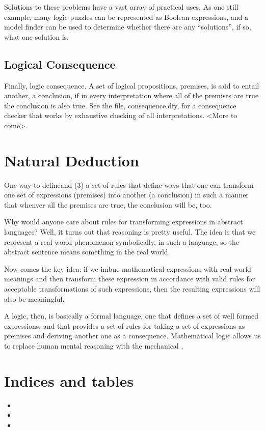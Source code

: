 \documentclass[letterpaper,10pt,english]{sphinxmanual}
\begin{document}
Solutions to these problems have a vast array of practical uses.  As
one still example, many logic puzzles can be represented as Boolean
expressions, and a model finder can be used to determine whether there
are any “solutions”, if so, what one solution is.


\section{Logical Consequence}
\label{\detokenize{08-propositional-logic:logical-consequence}}
Finally, logic consequence. A set of logical propositions, premises,
is said to entail another, a conclusion, if in every interpretation
where all of the premises are true the conclusion is also true. See
the file, consequence.dfy, for a consequence checker that works by
exhaustive checking of all interpretations. \textless{}More to come\textgreater{}.


\chapter{Natural Deduction}
\label{\detokenize{09-natural-deduction:natural-deduction}}\label{\detokenize{09-natural-deduction::doc}}
One way
to defineand (3) a set of  rules that define ways that one
can transform one set of expressions (premises) into another (a
conclusion) in such a manner that whenver all the premises are true,
the conclusion will be, too.

Why would anyone care about rules for transforming expressions in
abstract languages? Well, it turns out that  reasoning is
pretty useful. The idea is that we represent a real-world phenomenon
symbolically, in such a language, so the abstract sentence means
something in the real world.

Now comes the key idea: if we imbue mathematical expressions with
real-world meanings and then transform these expression in accordance
with valid rules for acceptable transformations of such expressions,
then the resulting expressions will also be meaningful.

A logic, then, is basically a formal language, one that defines a set
of well formed expressions, and that provides a set of 
rules for taking a set of expressions as premises and deriving another
one as a consequence. Mathematical logic allows us to replace human
mental reasoning with the mechanical .


\chapter{Indices and tables}
\label{\detokenize{index:indices-and-tables}}\begin{itemize}
\item {} 

\item {} 

\item {} 

\end{itemize}



\renewcommand{\indexname}{Index}
\printindex
\end{document}
